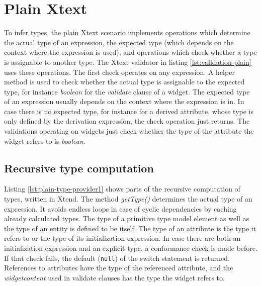 \section{Plain Xtext}
\label{sec:plain-xtext}

To infer types, the plain Xtext scenario implements operations which determine
the actual type of an expression, the expected type (which depends on the
context where the expression is used), and operations which check whether a type
is assignable to another type. The Xtext validator in listing
\ref{lst:validation-plain} uses these operations. The first check operates on
any expression. A helper method is used to check whether the actual type is assignable to the expected type, for instance \emph{boolean} for the
\emph{validate} clause of a widget. The expected type of an expression usually
depends on the context where the expression is in. In case there is no expected
type, for instance for a derived attribute, whose type is only defined by the
derivation expression, the check operation just returns. The validations
operating on widgets just check whether the type of the attribute the widget
refers to is \emph{boolean}.




\subsection{Recursive type computation}

Listing \ref{lst:plain-type-provider1} shows parts of the recursive computation
of types, written in Xtend. The method \emph{getType()} determines the actual
type of an expression. It avoids endless loops in case of cyclic dependencies by
caching already calculated types. The type of a primitive type model element as
well as the type of an entity is defined to be itself. The type of an attribute
is the type it refers to or the type of its initialization expression. In case
there are both an initialization expression and an explicit type, a conformance
check is made before. If that check fails, the default (\verb|null|) of the
switch statement is returned. References to attributes have the type of the
referenced attribute, and the \emph{widgetcontent} used in validate clauses has the type the widget refers to.


